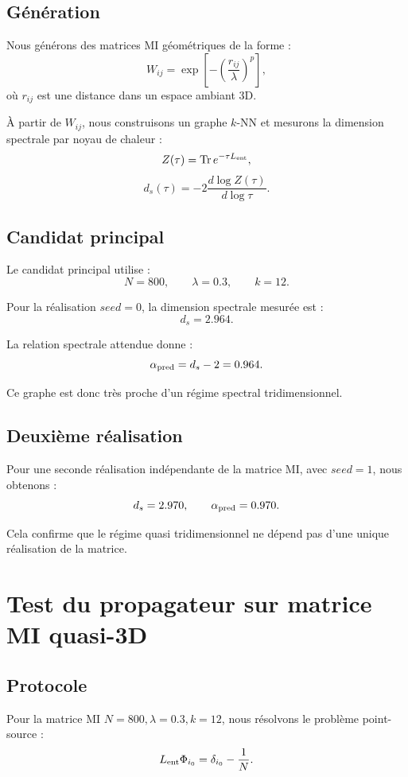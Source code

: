 \documentclass[11pt,a4paper]{article}
\begin{document}
\subsection{Génération}

Nous générons des matrices MI géométriques de la forme :
\[
W_{ij}
=
\exp\left[
-
\left(
\frac{r_{ij}}{\lambda}
\right)^p
\right],
\]
où \(r_{ij}\) est une distance dans un espace ambiant 3D.

À partir de \(W_{ij}\), nous construisons un graphe \(k\)-NN et mesurons la
dimension spectrale par noyau de chaleur :
\[
Z(\tau)=\Tr e^{-\tau L_{\rm ent}},
\]
\[
d_s(\tau)
=
-2
\frac{d\log Z(\tau)}{d\log\tau}.
\]

\subsection{Candidat principal}

Le candidat principal utilise :
\[
N=800,
\qquad
\lambda=0.3,
\qquad
k=12.
\]

Pour la réalisation \(seed=0\), la dimension spectrale mesurée est :
\[
d_s=2.964.
\]

La relation spectrale attendue donne :
\[
\alpha_{\rm pred}
=
d_s-2
=
0.964.
\]

Ce graphe est donc très proche d'un régime spectral tridimensionnel.

\subsection{Deuxième réalisation}

Pour une seconde réalisation indépendante de la matrice MI, avec \(seed=1\),
nous obtenons :
\[
d_s=2.970,
\qquad
\alpha_{\rm pred}=0.970.
\]

Cela confirme que le régime quasi tridimensionnel ne dépend pas d'une unique
réalisation de la matrice.

\section{Test du propagateur sur matrice MI quasi-3D}

\subsection{Protocole}

Pour la matrice MI \(N=800,\lambda=0.3,k=12\), nous résolvons le problème
point-source :
\[
L_{\rm ent}\Phi_{i_0}
=
\delta_{i_0}
-
\frac{1}{N}.
\]
\end{document}
